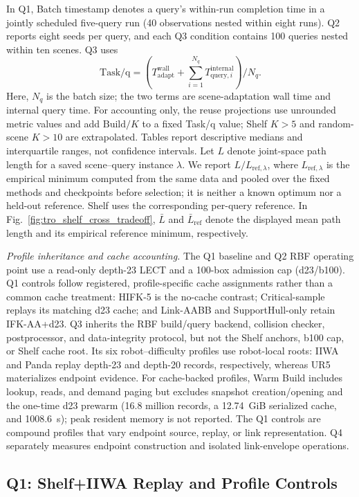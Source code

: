 \documentclass[journal]{IEEEtran}
\newcommand{\rbf}{RBF}
\begin{document}
In Q1, Batch timestamp denotes a query's within-run completion time in a jointly
scheduled five-query run (40 observations nested within eight runs). Q2 reports
eight seeds per query, and each Q3 condition contains 100
queries nested within ten scenes. Q3 uses
\[
\mathrm{Task/q}=\left(T_{\mathrm{adapt}}^{\mathrm{wall}}+
\sum_{i=1}^{N_q}T_{\mathrm{query},i}^{\mathrm{internal}}\right)/N_q.
\]
Here, $N_q$ is the batch size; the two terms are scene-adaptation wall time and
internal query time. For accounting only, the reuse projections use unrounded
metric values and add $\mathrm{Build}/K$ to a fixed Task/q value; Shelf $K>5$ and
random-scene $K>10$ are extrapolated. Tables report descriptive
medians and interquartile ranges, not confidence intervals. Let $L$ denote
joint-space path length for a saved scene--query instance $\lambda$. We report
$L/L_{\mathrm{ref},\lambda}$, where $L_{\mathrm{ref},\lambda}$ is the empirical
minimum computed from the same data and pooled over the fixed methods and
checkpoints before selection; it is neither a known optimum nor a held-out
reference. Shelf uses the corresponding per-query reference. In
Fig.~\ref{fig:tro_shelf_cross_tradeoff}, $\bar L$ and $\bar L_{\mathrm{ref}}$
denote the displayed mean path length and its empirical reference minimum,
respectively.

\noindent\emph{Profile inheritance and cache accounting.}
The Q1 baseline and Q2 \rbf{} operating point use a read-only depth-23 LECT and
a 100-box admission cap (d23/b100). Q1 controls follow registered,
profile-specific cache assignments rather than a common cache treatment:
HIFK-5 is the no-cache contrast; Critical-sample replays its matching d23 cache;
and Link-AABB and SupportHull-only retain IFK-AA+d23. Q3 inherits the \rbf{}
build/query backend, collision checker,
postprocessor, and data-integrity protocol, but not the Shelf anchors, b100 cap,
or Shelf cache root. Its six robot--difficulty profiles use robot-local roots:
IIWA and Panda replay depth-23 and depth-20 records, respectively, whereas UR5
materializes endpoint evidence. For cache-backed profiles, Warm Build includes
lookup, reads, and demand paging but excludes snapshot creation/opening and the
one-time d23 prewarm (16.8 million records, a 12.74~GiB serialized cache, and
1008.6~s); peak resident memory is not reported. The Q1 controls are compound
profiles that vary endpoint source, replay, or link representation. Q4
separately measures endpoint construction and isolated link-envelope
operations.

\subsection{Q1: Shelf+IIWA Replay and Profile Controls}
\label{sec:exp_shelf_iiwa}
\end{document}
